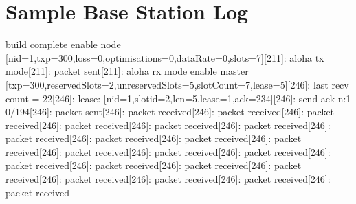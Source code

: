 \documentclass[parskip]{cs4rep}
\begin{document}
\appendix
\chapter{Sample Base Station Log}

build complete\newline
enable node [nid=1,txp=300,loss=0,optimisations=0,dataRate=0,slots=7][211]: aloha tx mode[211]: packet sent[211]: aloha rx mode\newline
enable master [txp=300,reservedSlots=2,unreservedSlots=5,slotCount=7,lease=5][246]: last recv count = 22[246]: lease: [nid=1,slotid=2,len=5,lease=1,ack=234][246]: send ack n:1 0/194[246]: packet sent[246]: packet received[246]: packet received[246]: packet received[246]: packet received[246]: packet received[246]: packet received[246]: packet received[246]: packet received[246]: packet received[246]: packet received[246]: packet received[246]: packet received[246]: packet received[246]: packet received[246]: packet received[246]: packet received[246]: packet received[246]: packet received[246]: packet received[246]: packet received[246]: packet received\newline
\end{document}
